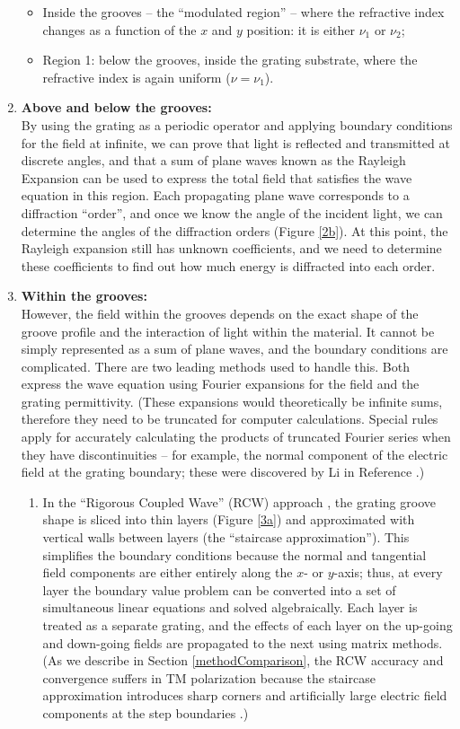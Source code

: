 \begin{enumerate}
\begin{itemize}
	\item Inside the grooves -- the ``modulated region'' -- where the refractive index changes as a function of the $x$ and $y$ position: it is either $\nu_1$ or $\nu_2$;
	\item Region 1: below the grooves, inside the grating substrate, where the refractive index is again uniform ($\nu=\nu_1$).
	\end{itemize}
\item \textbf{Above and below the grooves:}\\
By using the grating as a periodic operator and applying boundary conditions for the field at infinite, we can prove that light is reflected and transmitted at discrete angles, and that a sum of plane waves known as the Rayleigh Expansion can be used to express the total field that satisfies the wave equation in this region.  Each propagating plane wave corresponds to a diffraction ``order'', and once we know the angle of the incident light, we can determine the angles of the diffraction orders (Figure \ref{2b}).  At this point, the Rayleigh expansion still has unknown coefficients, and we need to determine these coefficients to find out how much energy is diffracted into each order.
\item \textbf{Within the grooves:}\\
However, the field within the grooves depends on the exact shape of the groove profile and the interaction of light within the material.  It cannot be simply represented as a sum of plane waves, and the boundary conditions are complicated.  There are two leading methods used to handle this.  Both express the wave equation using Fourier expansions for the field and the grating permittivity.  (These expansions would theoretically be infinite sums, therefore they need to be truncated for computer calculations.  Special rules apply for accurately calculating the products  of truncated Fourier series when they have discontinuities -- for example, the normal component of the electric field at the grating boundary; these were discovered by Li in Reference \cite{Li96b}.)
\begin{enumerate} 
	\item In the ``Rigorous Coupled Wave'' (RCW) approach \cite{Moh81} \cite{Moh95}, the grating groove shape is sliced into thin layers (Figure \ref{3a}) and approximated with vertical walls between layers (the ``staircase approximation'').  This simplifies the boundary conditions because the normal and tangential field components are either entirely along the $x$- or $y$-axis; thus, at every layer the boundary value problem can be converted into a set of simultaneous linear equations and solved algebraically.  Each layer is treated as a separate grating, and the effects of each layer on the up-going and down-going fields are propagated to the next using matrix methods.  (As we describe in Section \ref{methodComparison}, the RCW accuracy and convergence suffers in TM polarization because the staircase approximation introduces sharp corners and artificially large electric field components at the step boundaries \cite{Pop02}.)
	

\end{enumerate}
\end{enumerate}

